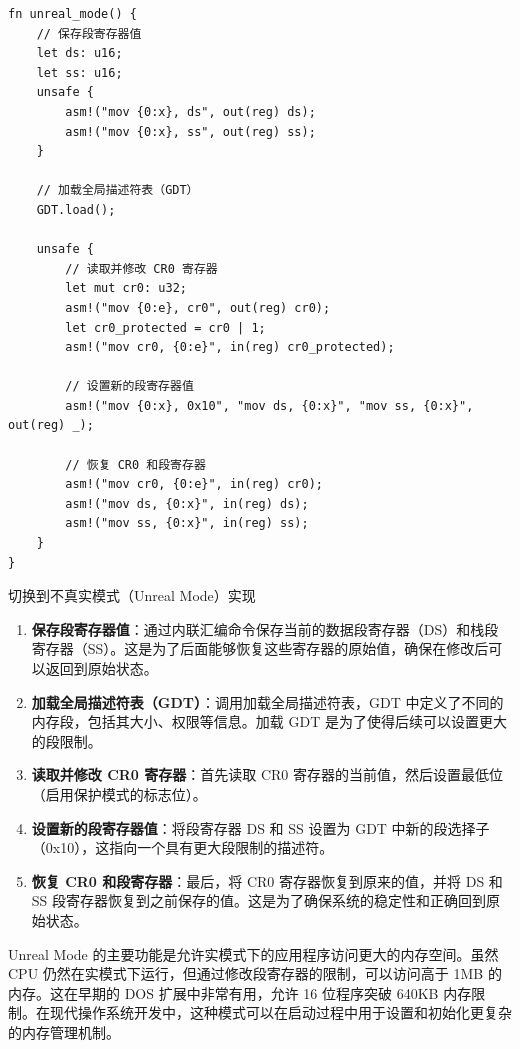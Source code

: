 \begin{listing}[htbp]
    \begin{verbatim}
fn unreal_mode() {
    // 保存段寄存器值
    let ds: u16;
    let ss: u16;
    unsafe {
        asm!("mov {0:x}, ds", out(reg) ds);
        asm!("mov {0:x}, ss", out(reg) ss);
    }

    // 加载全局描述符表（GDT）
    GDT.load();

    unsafe {
        // 读取并修改 CR0 寄存器
        let mut cr0: u32;
        asm!("mov {0:e}, cr0", out(reg) cr0);
        let cr0_protected = cr0 | 1;
        asm!("mov cr0, {0:e}", in(reg) cr0_protected);

        // 设置新的段寄存器值
        asm!("mov {0:x}, 0x10", "mov ds, {0:x}", "mov ss, {0:x}", out(reg) _);

        // 恢复 CR0 和段寄存器
        asm!("mov cr0, {0:e}", in(reg) cr0);
        asm!("mov ds, {0:x}", in(reg) ds);
        asm!("mov ss, {0:x}", in(reg) ss);
    }
}
    \end{verbatim}
    \caption{切换到不真实模式（Unreal Mode）实现}\label{lst:UnrealModeMethod}
\end{listing}

\begin{enumerate}
    \item \textbf{保存段寄存器值}：通过内联汇编命令保存当前的数据段寄存器（DS）和栈段寄存器（SS）。这是为了后面能够恢复这些寄存器的原始值，确保在修改后可以返回到原始状态。
    \item \textbf{加载全局描述符表（GDT）}：调用加载全局描述符表，GDT 中定义了不同的内存段，包括其大小、权限等信息。加载 GDT 是为了使得后续可以设置更大的段限制。
    \item \textbf{读取并修改 CR0 寄存器}：首先读取 CR0 寄存器的当前值，然后设置最低位（启用保护模式的标志位）。
    \item \textbf{设置新的段寄存器值}：将段寄存器 DS 和 SS 设置为 GDT 中新的段选择子（0x10），这指向一个具有更大段限制的描述符。
    \item \textbf{恢复 CR0 和段寄存器}：最后，将 CR0 寄存器恢复到原来的值，并将 DS 和 SS 段寄存器恢复到之前保存的值。这是为了确保系统的稳定性和正确回到原始状态。
\end{enumerate}

Unreal Mode 的主要功能是允许实模式下的应用程序访问更大的内存空间。虽然 CPU 仍然在实模式下运行，但通过修改段寄存器的限制，可以访问高于 1MB 的内存。这在早期的 DOS 扩展中非常有用，允许 16 位程序突破 640KB 内存限制。在现代操作系统开发中，这种模式可以在启动过程中用于设置和初始化更复杂的内存管理机制。

